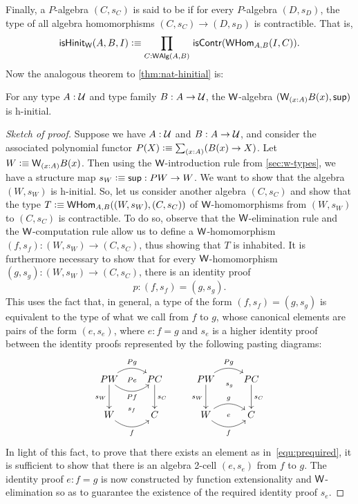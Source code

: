 %
Finally, a $P$-algebra $(C, s_C)$ is said to be 
%
%
if for every $P$-algebra $(D, s_D)$, the type of all algebra homomorphisms $(C, s_C) \rightarrow (D, s_D)$ is contractible.
That is,
\begin{equation*}
\ishinitw(A,B,I) \defeq \prd{C : \walg(A,B)} \iscontr(\whom_{A,B}(I,C)).
\end{equation*}
%
Now the analogous theorem to \cref{thm:nat-hinitial} is:

\begin{thm}\label{thm:w-hinit}
For any type $A : \mathcal{U}$ and type family $B : A \to \mathcal{U}$, the $\mathsf{W}$-algebra $(\wtype{x:A}B(x), \supp)$ is h-initial.
\end{thm}

\begin{proof}[Sketch of proof]
Suppose we have $A : \mathcal{U}$ and $B : A \to \mathcal{U}$,
and consider the associated polynomial functor $P(X)\defeq\sm{x:A}(B(x)\to X)$.
Let $W \defeq \wtype{x:A}B(x)$.  Then using
the $\mathsf{W}$-introduction rule from \cref{sec:w-types}, we have a structure map $s_W\vcentcolon\equiv{\mathsf{sup}}: PW \rightarrow W$.
We want to show that the algebra $(W, s_W)$ is
h-initial. So, let us consider another algebra $(C,s_C)$ and show that the type $T\vcentcolon\equiv \mathsf{W}\mathsf{Hom}_{A,B}((W, s_W),(C,s_C)) $
of  $\mathsf{W}$-homomorphisms from $(W, s_W)$ to $(C, s_C)$ is contractible. To do
so, observe that the $\mathsf{W}$-elimination rule and the $\mathsf{W}$-computation
rule allow us to define a $\mathsf{W}$-homomorphism $(f, s_f) : (W, s_W) \rightarrow (C, s_C)$,
thus showing that $T$ is inhabited. It is furthermore necessary to show that for every $\mathsf{W}$-ho\-mo\-mor\-phism $(g, s_g) : (W, s_W) \rightarrow (C, s_C)$, there is an identity proof
\begin{equation}
\label{equ:prequired}
p :  (f,s_f) = (g,s_g).
\end{equation}
This uses the fact that, in general, a type of the form $(f,s_f) = (g,s_g) $
is  equivalent to the type of what we call 
%
from $f$ to $g$, whose canonical
elements are pairs of the form $(e, s_e)$, where $e : f=g$ and $s_e$ is a higher identity proof between the identity proofs represented by the following pasting diagrams:
\[
\xymatrix{
PW \ar@/^1pc/[r]^{Pg}   \ar[d]_{s_W}   \ar@/_1pc/[r]_{Pf} \ar@{}[r]|{Pe}
& PC \ar[d]^{s_C}  \\
W  \ar@/_1pc/[r]_f  \ar@{}[r]^{s_f} & C } \qquad
\xymatrix{
PW \ar@/^1pc/[r]^{Pg}   \ar[d]_{s_W} \ar@{}[r]_(.52){s_g}  & PC \ar[d]^{s_C}  \\
W \ar@/^1pc/[r]^g  \ar@/_1pc/[r]_f  \ar@{}[r]|{e} & C }
\]
In light of this fact, to prove that there exists an element as in~\eqref{equ:prequired}, it is
sufficient to show that there is an algebra 2-cell $(e,s_e)$ from $f$ to $g$.
The identity proof $e : f=g$ is now constructed by function extensionality and
$\mathsf{W}$-elimination so as to guarantee the existence of the required identity
proof $s_e$.
\end{proof}

